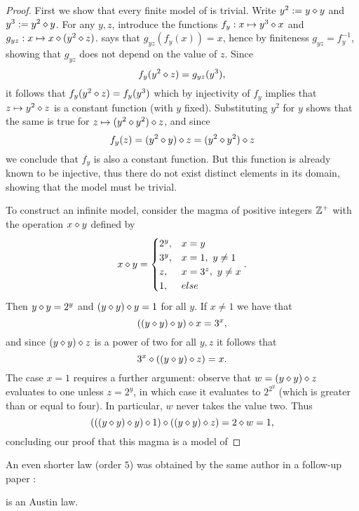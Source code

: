 \begin{proof} \leanok  First we show that every finite model of  is trivial.  Write $y^2 := y \diamond y$ and $y^3 := y^2 \diamond y$.  For any $y,z$, introduce the functions ${f_y: x \mapsto y^3 \diamond x}$ and ${g_{yz}: x \mapsto x \diamond (y^2 \diamond z)}$.   says that $g_{yz}(f_y(x))=x$, hence by finiteness $g_{yz}=f_y^{-1}$, showing that $g_{yz}$ does not depend on the value of $z$.  Since
$$ f_y(y^2 \diamond z) = g_{yz}(y^3),$$
it follows that $f_y(y^2 \diamond z)=f_y(y^3)$ which by injectivity of $f_y$ implies that $z\mapsto y^2 \diamond z$ is a constant function (with $y$ fixed).  Substituting $y^2$ for $y$ shows that the same is true for $z\mapsto (y^2 \diamond y^2) \diamond z$, and since
$$ f_y(z) = (y^2 \diamond y) \diamond z = (y^2 \diamond y^2) \diamond z$$
we conclude that $f_y$ is also a constant function.  But this function is already known to be injective, thus there do not exist distinct elements in its domain, showing that the model must be trivial.

To construct an infinite model, consider the magma of positive integers $\mathbb{Z}^+$ with the operation $x \diamond y$ defined by
$$
x \diamond y =
\begin{cases}
2^y, & x=  y            \\
3^y, & x=  1,\ y \neq 1 \\
  z, & x=3^z,\ y \neq x \\
  1, & else
\end{cases}.
$$
Then $y \diamond y = 2^y$ and $(y \diamond y) \diamond y = 1$ for all $y$.  If $x\neq 1$ we have that
$$ ((y \diamond y) \diamond y) \diamond x = 3^x, $$
and since $(y \diamond y) \diamond z$ is a power of two for all $y, z$ it follows that
$$ 3^x \diamond ((y \diamond y) \diamond z) = x. $$
The case $x=1$ requires a further argument: observe that $w = (y \diamond y) \diamond z$ evaluates to one unless $z = 2^y$, in which case it evaluates to $2^{2^y}$ (which is greater than or equal to four).  In particular, $w$ never takes the value two.  Thus
$$ (((y \diamond y) \diamond y) \diamond 1) \diamond ((y \diamond y) \diamond z) = 2 \diamond w = 1, $$
concluding our proof that this magma is a model of 
\end{proof}

An even shorter law (order $5$) was obtained by the same author in a follow-up paper \cite{Kisielewicz2}:

\begin{theorem}\label{kis-thm2}\leanok {} is an Austin law.
\end{theorem}

